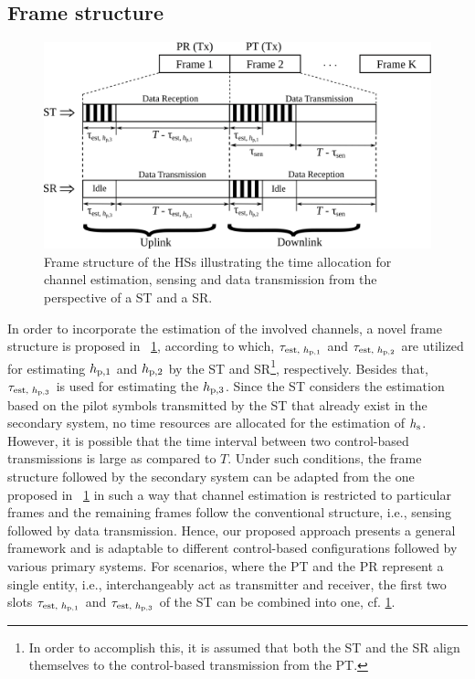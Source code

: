 \subsection{Frame structure}
\begin{figure}[!t]
\centering
\includegraphics[width = \columnwidth]{figures/Frame_Structure}
\caption{Frame structure of the HSs illustrating the time allocation for channel estimation, sensing and data transmission from the perspective of a ST and a SR.} 
\label{fig:fs}
\vspace{-7mm}
\end{figure}
In order to incorporate the estimation of the involved channels, a novel frame structure is proposed in \figurename~\ref{fig:fs}, according to which, $\tau_{\text{est, $h_{\text{p,1}}$}}$ and $\tau_{\text{est, $h_{\text{p,2}}$}}$ are utilized for estimating $h_{\text{p,1}}$ and $h_{\text{p,2}}$ by the ST and SR\footnote{In order to accomplish this, it is assumed that both the ST and the SR align themselves to the control-based transmission from the PT.}, respectively. Besides that, $\tau_{\text{est, $h_{\text{p,3}}$}}$ is used for estimating the $h_{\text{p,3}}$. Since the ST considers the estimation based on the pilot symbols transmitted by the ST that already exist in the secondary system, no time resources are allocated for the estimation of $h_{\text{s}}$. However, it is possible that the time interval between two control-based transmissions is large as compared to $T$. Under such conditions, the frame structure followed by the secondary system can be adapted from the one proposed in \figurename~\ref{fig:fs} in such a way that channel estimation is restricted to particular frames and the remaining frames follow the conventional structure, i.e., sensing followed by data transmission. Hence, our proposed approach presents a general framework and is adaptable to different control-based configurations followed by various primary systems. For scenarios, where the PT and the PR represent a single entity, i.e., interchangeably act as transmitter and receiver, the first two slots $\tau_{\text{est, $h_{\text{p,1}}$}}$ and $\tau_{\text{est, $h_{\text{p,3}}$}}$ of the ST can be combined into one, cf. \figurename\ref{fig:fs}. 


